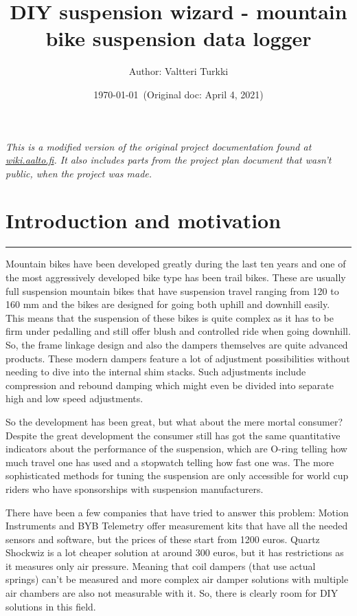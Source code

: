 \documentclass[a4paper,11pt]{article}
\title{DIY suspension wizard - mountain bike suspension data logger}
\author{Author: Valtteri Turkki}
\date{ \today\ (Original doc: April 4, 2021) }
\begin{document}
\maketitle

\textit{This is a modified version of the original project documentation found at \href{https://wiki.aalto.fi/display/MEX/DIY+suspension+wizard+-+mountain+bike+suspension+data+logger?searchId=LL4XGUSZ1}{wiki.aalto.fi}. It also includes parts from the project plan document that wasn't public, when the project was made.}\\

\vspace{2cm}

\tableofcontents

\newpage
\section{Introduction and motivation}
\rule{12.7cm}{0.4pt}

Mountain bikes have been developed greatly during the last ten years and one of the most aggressively developed bike type has been trail bikes. These are usually full suspension mountain bikes that have suspension travel ranging from 120 to 160 mm and the bikes are designed for going both uphill and downhill easily. This means that the suspension of these bikes is quite complex as it has to be firm under pedalling and still offer blush and controlled ride when going downhill. So, the frame linkage design and also the dampers themselves are quite advanced products. These modern dampers feature a lot of adjustment possibilities without needing to dive into the internal shim stacks. Such adjustments include compression and rebound damping which might even be divided into separate high and low speed adjustments.

So the development has been great, but what about the mere mortal consumer? Despite the great development the consumer still has got the same quantitative indicators about the performance of the suspension, which are O-ring telling how much travel one has used and a stopwatch telling how fast one was. The more sophisticated methods for tuning the suspension are only accessible for world cup riders who have sponsorships with suspension manufacturers.

There have been a few companies that have tried to answer this problem: Motion Instruments and BYB Telemetry offer measurement kits that have all the needed sensors and software, but the prices of these start from 1200 euros. Quartz Shockwiz is a lot cheaper solution at around 300 euros, but it has restrictions as it measures only air pressure. Meaning that coil dampers (that use actual springs) can't be measured and more complex air damper solutions with multiple air chambers are also not measurable with it. So, there is clearly room for DIY solutions in this field.
\end{document}
